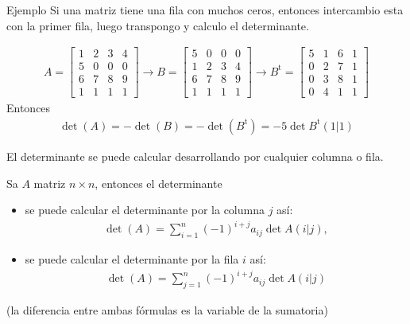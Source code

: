\documentclass[handout]{beamer} %
\renewcommand{\t}{{\operatorname{t}}}
\renewcommand{\t}{{\operatorname{t}}}
\begin{document}
    \begin{frame}
    \begin{exampleblock}{Ejemplo}
    Si una matriz tiene una fila con muchos ceros, entonces intercambio esta con la primer fila, luego transpongo y calculo el determinante.
    \end{exampleblock}
    
    \begin{align*}
    A= \left[
    \begin{array}{cccc}
    1&2&3&4\\
    5&0&0&0\\
    6&7&8&9\\
    1&1&1&1
    \end{array}
    \right]
    \rightarrow
    B=
     \left[
    \begin{array}{cccc}
    5&0&0&0\\
    1&2&3&4\\
    6&7&8&9\\
    1&1&1&1
    \end{array}
    \right]
    \rightarrow
    B^\t=
     \left[
    \begin{array}{cccc}
    5&1&6&1\\
    0&2&7&1\\
    0&3&8&1\\
    0&4&1&1
    \end{array}
    \right]
    \end{align*}
    Entonces
    \begin{align*}
    \det(A)=-\det(B)=-\det(B^\t)=-5\det B^\t(1|1)
    \end{align*}
    \end{frame}
    
   
    
    
    \begin{frame}
    
    El determinante se puede calcular desarrollando por cualquier columna o fila.
    
    \begin{teorema}
        Sa $A$ matriz $n \times n$, entonces el determinante
    \begin{itemize}
     \item se puede calcular el determinante por la columna $j$ así:
    \begin{align*}
    \det(A)=\sum_{i=1}^n(-1)^{i+j}a_{ij}\det A(i|j),
    \end{align*}
     \item se puede calcular el determinante por la fila $i$ así:
    \begin{align*}
    \det(A)=\sum_{j=1}^n(-1)^{i+j}a_{ij}\det A(i|j)
    \end{align*}
    \end{itemize}
    \end{teorema}
    (la diferencia entre ambas fórmulas es la variable de la sumatoria)
    \end{frame}
    
\end{document}
